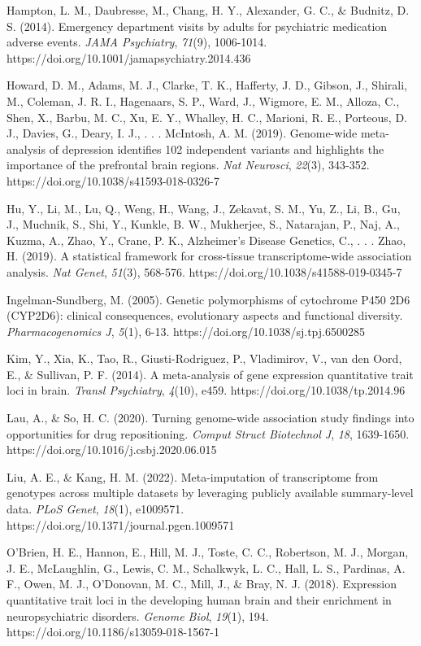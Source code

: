 \documentclass[
]{article}
\begin{document}
Hampton, L. M., Daubresse, M., Chang, H. Y., Alexander, G. C., \&
Budnitz, D. S. (2014). Emergency department visits by adults for
psychiatric medication adverse events. \emph{JAMA Psychiatry},
\emph{71}(9), 1006-1014.
https://doi.org/10.1001/jamapsychiatry.2014.436{~}

Howard, D. M., Adams, M. J., Clarke, T. K., Hafferty, J. D., Gibson, J.,
Shirali, M., Coleman, J. R. I., Hagenaars, S. P., Ward, J., Wigmore, E.
M., Alloza, C., Shen, X., Barbu, M. C., Xu, E. Y., Whalley, H. C.,
Marioni, R. E., Porteous, D. J., Davies, G., Deary, I. J., . . .
McIntosh, A. M. (2019). Genome-wide meta-analysis of depression
identifies 102 independent variants and highlights the importance of the
prefrontal brain regions. \emph{Nat Neurosci}, \emph{22}(3), 343-352.
https://doi.org/10.1038/s41593-018-0326-7{~}

Hu, Y., Li, M., Lu, Q., Weng, H., Wang, J., Zekavat, S. M., Yu, Z., Li,
B., Gu, J., Muchnik, S., Shi, Y., Kunkle, B. W., Mukherjee, S.,
Natarajan, P., Naj, A., Kuzma, A., Zhao, Y., Crane, P. K., Alzheimer's
Disease Genetics, C., . . . Zhao, H. (2019). A statistical framework for
cross-tissue transcriptome-wide association analysis. \emph{Nat Genet},
\emph{51}(3), 568-576. https://doi.org/10.1038/s41588-019-0345-7{~}

Ingelman-Sundberg, M. (2005). Genetic polymorphisms of cytochrome P450
2D6 (CYP2D6): clinical consequences, evolutionary aspects and functional
diversity. \emph{Pharmacogenomics J}, \emph{5}(1), 6-13.
https://doi.org/10.1038/sj.tpj.6500285{~}

Kim, Y., Xia, K., Tao, R., Giusti-Rodriguez, P., Vladimirov, V., van den
Oord, E., \& Sullivan, P. F. (2014). A meta-analysis of gene expression
quantitative trait loci in brain. \emph{Transl Psychiatry},
\emph{4}(10), e459. https://doi.org/10.1038/tp.2014.96{~}

Lau, A., \& So, H. C. (2020). Turning genome-wide association study
findings into opportunities for drug repositioning. \emph{Comput Struct
Biotechnol J}, \emph{18}, 1639-1650.
https://doi.org/10.1016/j.csbj.2020.06.015{~}

Liu, A. E., \& Kang, H. M. (2022). Meta-imputation of transcriptome from
genotypes across multiple datasets by leveraging publicly available
summary-level data. \emph{PLoS Genet}, \emph{18}(1), e1009571.
https://doi.org/10.1371/journal.pgen.1009571{~}

O'Brien, H. E., Hannon, E., Hill, M. J., Toste, C. C., Robertson, M. J.,
Morgan, J. E., McLaughlin, G., Lewis, C. M., Schalkwyk, L. C., Hall, L.
S., Pardinas, A. F., Owen, M. J., O'Donovan, M. C., Mill, J., \& Bray,
N. J. (2018). Expression quantitative trait loci in the developing human
brain and their enrichment in neuropsychiatric disorders. \emph{Genome
Biol}, \emph{19}(1), 194. https://doi.org/10.1186/s13059-018-1567-1{~}
\end{document}
